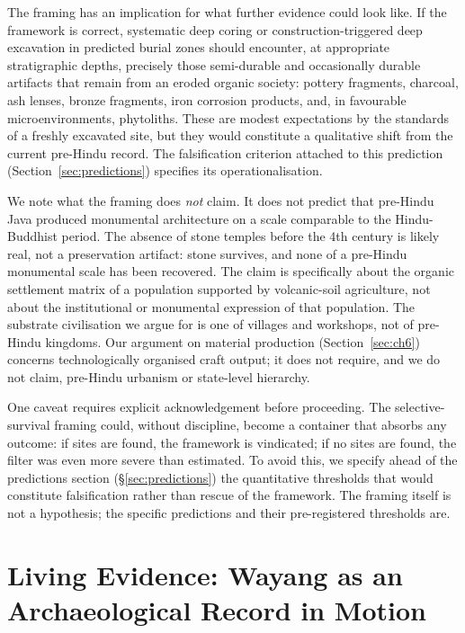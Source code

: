 \documentclass[12pt,a4paper]{article}
\begin{document}
The framing has an implication for what further evidence could look like. If the framework is correct, systematic deep coring or construction-triggered deep excavation in predicted burial zones should encounter, at appropriate stratigraphic depths, precisely those semi-durable and occasionally durable artifacts that remain from an eroded organic society: pottery fragments, charcoal, ash lenses, bronze fragments, iron corrosion products, and, in favourable microenvironments, phytoliths. These are modest expectations by the standards of a freshly excavated site, but they would constitute a qualitative shift from the current pre-Hindu record. The falsification criterion attached to this prediction (Section~\ref{sec:predictions}) specifies its operationalisation.

We note what the framing does \textit{not} claim. It does not predict that pre-Hindu Java produced monumental architecture on a scale comparable to the Hindu-Buddhist period. The absence of stone temples before the 4th century is likely real, not a preservation artifact: stone survives, and none of a pre-Hindu monumental scale has been recovered. The claim is specifically about the organic settlement matrix of a population supported by volcanic-soil agriculture, not about the institutional or monumental expression of that population. The substrate civilisation we argue for is one of villages and workshops, not of pre-Hindu kingdoms. Our argument on material production (Section~\ref{sec:ch6}) concerns technologically organised craft output; it does not require, and we do not claim, pre-Hindu urbanism or state-level hierarchy.

One caveat requires explicit acknowledgement before proceeding. The selective-survival framing could, without discipline, become a container that absorbs any outcome: if sites are found, the framework is vindicated; if no sites are found, the filter was even more severe than estimated. To avoid this, we specify ahead of the predictions section (\S\ref{sec:predictions}) the quantitative thresholds that would constitute falsification rather than rescue of the framework. The framing itself is not a hypothesis; the specific predictions and their pre-registered thresholds are.


\section{Living Evidence: Wayang as an Archaeological Record in Motion}
\label{sec:wayang}
\end{document}
